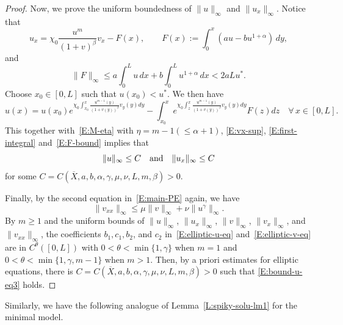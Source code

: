 \documentclass[11pt]{article} %
\theoremstyle{remark}
\theoremstyle{remark}
\numberwithin{equation}{section}
\numberwithin{figure}{section}
\numberwithin{table}{section}
\begin{document}
\begin{proof}
  Now, we prove the uniform boundedness of $\|u\|_\infty$ and $\|u_x\|_\infty$.
  Notice that
  \begin{equation}\label{E:first-integral}
    u_x=\chi_0\frac{u^m}{(1+v)^{\beta}}v_x-F(x),
    \qquad F(x):=\int_0^x\left(au-bu^{1+\alpha}\right)\,dy,
  \end{equation}
  and
  \begin{equation}\label{E:F-bound}
    \|F\|_\infty
    \le a\int_0^L u\,dx+b\int_0^L u^{1+\alpha}\,dx<2aLu^*.
  \end{equation}
  Choose $x_0 \in [0,L]$ such that $u(x_0) < u^*$. We then have
  \[
    u(x)=u(x_0)e^{\chi_0 \int_{x_0}^ x\frac{u^{m-1}(y)}{(1+v(y))^\beta}v_y(y)dy}-\int_{x_0}^x
    e^{\chi_0\int_z^x \frac{u^{m-1}(y)}{(1+v(y))^\beta} v_y(y)dy} F(z) dz\quad \forall \, x\in [0,L].
  \]
  This together with~\eqref{E:M-eta} with $\eta = m-1( \le \alpha+1)$,
  \eqref{E:vx-sup}, \eqref{E:first-integral} and~\eqref{E:F-bound} implies that
  \begin{equation}\label{E:u-ux-sup}
    \|u\|_\infty\le C
    \quad {\rm and}\quad
    \|u_x\|_\infty\le C
  \end{equation}
  for some $C = C(\overline{X}, a, b, \alpha, \gamma, \mu, \nu, L, m, \beta) >
  0$.

  Finally, by the second equation in~\eqref{E:main-PE} again, we have
  \begin{equation}\label{E:vxx-sup}
    \|v_{xx}\|_\infty\le \mu\|v\|_\infty+\nu\|u^\gamma\|_\infty.
  \end{equation}
  By $m \ge 1$ and the uniform bounds of $\|u\|_\infty$, $\|u_x\|_\infty$,
  $\|v\|_\infty$, $\|v_x\|_\infty$, and $\|v_{xx}\|_\infty$, the coefficients
  $b_1,c_1,b_2$, and $c_2$ in~\eqref{E:elliptic-u-eq}
  and~\eqref{E:elliptic-v-eq} are in $C^\theta([0,L])$ with $0 < \theta <
  \min\{1,\gamma\}$ when $m = 1$ and $0 < \theta < \min\{1,\gamma,m-1\}$ when $m
  > 1$. Then, by a priori estimates for elliptic equations, there is $C =
  C(\overline{X}, a, b, \alpha, \gamma, \mu, \nu, L, m, \beta) > 0$ such that
  \eqref{E:bound-u-eq3} holds.
\end{proof}


Similarly, we have the following analogue of Lemma~\ref{L:spiky-solu-lm1} for
the minimal model.
\end{document}
